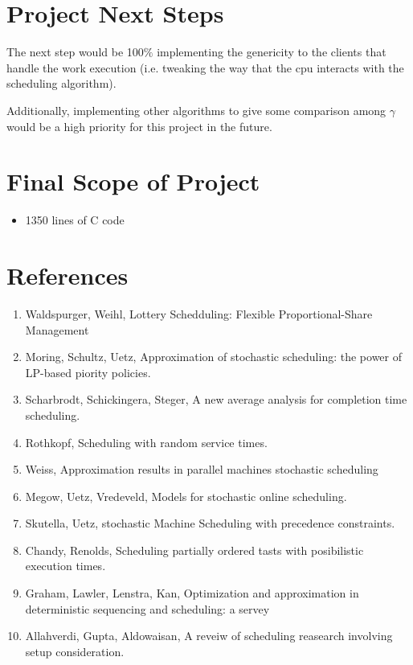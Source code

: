 \documentclass[acmsmall]{acmart}
\begin{document}
\begin{multicols}{2}
\section{Project Next Steps}
  The next step would be 100$\%$ implementing the genericity to the clients that
  handle the work execution (i.e. tweaking the way that the cpu interacts with
  the scheduling algorithm).
  \par
  Additionally, implementing other algorithms to give some comparison among
  $\gamma$ would be a high priority for this project in the future.

\section{Final Scope of Project}
  \begin{itemize}
    \item 1350 lines of C code
  \end{itemize}

\end{multicols}
\section{References}
\begin{enumerate}
  \item Waldspurger, Weihl, Lottery Schedduling: Flexible Proportional-Share
    Management
  \item Moring, Schultz, Uetz, Approximation of stochastic scheduling: the
    power of LP-based piority policies.
  \item Scharbrodt, Schickingera, Steger, A new average analysis for completion
    time scheduling.
  \item Rothkopf, Scheduling with random service times.
  \item Weiss, Approximation results in parallel machines stochastic scheduling
  \item Megow, Uetz, Vredeveld, Models for stochastic online scheduling.
  \item Skutella, Uetz, stochastic Machine Scheduling with precedence
    constraints.
  \item Chandy, Renolds, Scheduling partially ordered tasts with posibilistic
    execution times.
  \item Graham, Lawler, Lenstra, Kan, Optimization and approximation in
    deterministic sequencing and scheduling: a servey
  \item Allahverdi, Gupta, Aldowaisan, A reveiw of scheduling reasearch
    involving setup consideration.
\end{enumerate}
\end{document}
